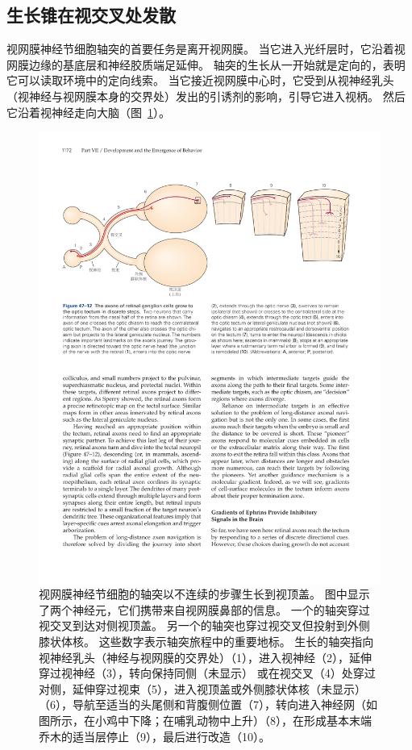 \subsection{生长锥在视交叉处发散}

视网膜神经节细胞轴突的首要任务是离开视网膜。
当它进入光纤层时，它沿着视网膜边缘的基底层和神经胶质端足延伸。
轴突的生长从一开始就是定向的，表明它可以读取环境中的定向线索。
当它接近视网膜中心时，它受到从视神经乳头（视神经与视网膜本身的交界处）发出的引诱剂的影响，引导它进入视柄。
然后它沿着视神经走向大脑（图~\ref{fig:47_12}）。


\begin{figure}[htbp]
	\centering
	\includegraphics[width=0.95\linewidth]{chap47/fig_47_12}
	\caption{视网膜神经节细胞的轴突以不连续的步骤生长到视顶盖。
		图中显示了两个神经元，它们携带来自视网膜鼻部的信息。
		一个的轴突穿过视交叉到达对侧视顶盖。
		另一个的轴突也穿过视交叉但投射到外侧膝状体核。
		这些数字表示轴突旅程中的重要地标。
		生长的轴突指向视神经乳头（神经与视网膜的交界处）（1），进入视神经（2），延伸穿过视神经（3），转向保持同侧（未显示） 或在视交叉（4）处穿过对侧，延伸穿过视束（5），进入视顶盖或外侧膝状体核（未显示）（6），导航至适当的头尾侧和背腹侧位置（7），转向进入神经网（如图所示，在小鸡中下降；在哺乳动物中上升）（8），在形成基本末端乔木的适当层停止（9），最后进行改造（10）。}
	\label{fig:47_12}
\end{figure}


